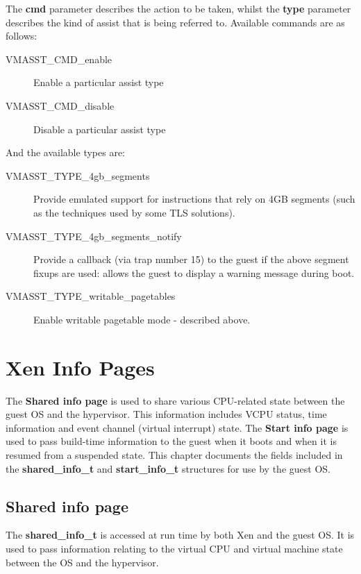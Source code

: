 \documentclass[11pt,twoside,final,openright,a4paper]{report}
\newcommand{\hypercall}[1]{\vspace{2mm}{\sf #1}}
\begin{document}
\hypercall{vm\_assist(unsigned int cmd, unsigned int type)}

The {\bf cmd} parameter describes the action to be taken, whilst the
{\bf type} parameter describes the kind of assist that is being
referred to.  Available commands are as follows:

\begin{description}
\item[VMASST\_CMD\_enable] Enable a particular assist type
\item[VMASST\_CMD\_disable] Disable a particular assist type
\end{description}

And the available types are:

\begin{description}
\item[VMASST\_TYPE\_4gb\_segments] Provide emulated support for
  instructions that rely on 4GB segments (such as the techniques used
  by some TLS solutions).
\item[VMASST\_TYPE\_4gb\_segments\_notify] Provide a callback (via trap number
  15) to the guest if the above segment fixups are used: allows the guest to
  display a warning message during boot.
\item[VMASST\_TYPE\_writable\_pagetables] Enable writable pagetable
  mode - described above.
\end{description}


\chapter{Xen Info Pages}

The {\bf Shared info page} is used to share various CPU-related state
between the guest OS and the hypervisor.  This information includes VCPU
status, time information and event channel (virtual interrupt) state.
The {\bf Start info page} is used to pass build-time information to
the guest when it boots and when it is resumed from a suspended state.
This chapter documents the fields included in the {\bf
shared\_info\_t} and {\bf start\_info\_t} structures for use by the
guest OS.

\section{Shared info page}

The {\bf shared\_info\_t} is accessed at run time by both Xen and the
guest OS.  It is used to pass information relating to the
virtual CPU and virtual machine state between the OS and the
hypervisor.
\end{document}
